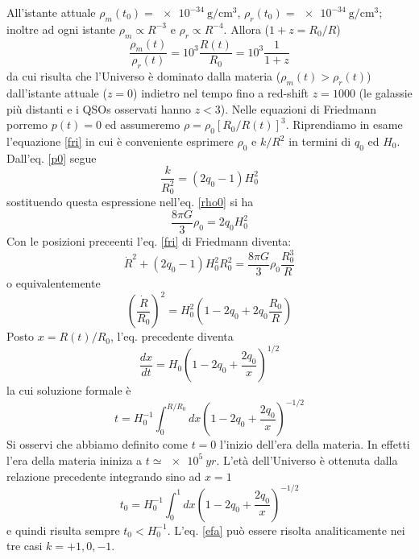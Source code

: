 All'istante attuale $\rho_m(t_0) = \SI{e-34}{\gram\per\centi\metre\cubed}$,
$\rho_r(t_0)= \SI{e-34}{\gram\per\centi\metre\cubed}$; inoltre ad ogni istante
$\rho_m \propto R^{-3}$ e $\rho_r \propto R^{-4}$. Allora ($1+z=R_0/R$)
\begin{equation}
  \frac {\rho_m(t)} {\rho_r(t)} = 10^{3} \frac {R(t)} {R_0}= 10^3 \frac{1}{1+z}
\end{equation}
da cui risulta che l'Universo è dominato dalla materia ($\rho_m(t) > \rho_r(t)$)
dall'istante attuale ($z=0$) indietro nel tempo fino a red-shift $z = 1000$ (le
galassie più distanti e i QSOs osservati hanno $z<3$).  Nelle equazioni di
Friedmann porremo $p(t)=0$ ed assumeremo $\rho = \rho_0 [R_0/R(t)]^{3}$.
Riprendiamo in esame l'equazione \eqref{fri} in cui è conveniente esprimere
$\rho_0$ e $k/R^2$ in termini di $q_0$ ed $H_0$.  Dall'eq. \eqref{p0} segue
\begin{equation}
  \frac{k}{R_0^2}=(2q_0-1) H_0^2
\end{equation}
sostituendo questa espressione nell'eq. \eqref{rho0} si ha
\begin{equation}
  \frac{8\pi G}{3} \rho_0 = 2q_0 H_0^2
\end{equation}
Con le posizioni preceenti l'eq. \eqref{fri} di Friedmann diventa:
\begin{equation}
  \dot { R } ^2 + (2 q_0-1) H_0^2 R_0^2 = \frac{8\pi G}{3} \rho_0 \frac{R_0^3}{R}
\end{equation}
o equivalentemente
\begin{equation}
  \left(\frac{\dot R}{R_0}\right)^2 = H_0^2 \left(1-2q_0+2 q_0
    \frac{R_0}{R}\right)
\end{equation}
Posto $x=R(t)/R_0$, l'eq. precedente diventa
\begin{equation}
  \frac{dx}{dt}= H_0 \left(1-2q_0+ \frac {2q_0}{x}\right)^{1/2}
\end{equation}
la cui soluzione formale è
\begin{equation}
  t= H_0^{-1} \int_0^{R/R_0} dx \left(1-2q_0+\frac{2q_0}{x}\right)^{-1/2}
  \label{efa}
\end{equation}
Si osservi che abbiamo definito come $t=0$ l'inizio dell'era della materia.  In
effetti l'era della materia ininiza a $t \simeq \SI{e5}{yr}$.  L'età
dell'Universo è ottenuta dalla relazione precedente integrando sino ad $x=1$
\begin{equation}
  t_0= H_0^{-1} \int_0^{1} dx \left(1-2q_0+\frac{2q_0}{x}\right)^{-1/2}
\end{equation}
e quindi risulta sempre $t_0< H_0^{-1}$.  L'eq. \eqref{efa} può essere risolta
analiticamente nei tre casi $k=+1,0,-1$.


